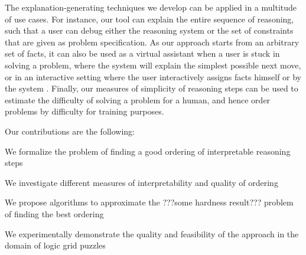 The explanation-generating techniques we develop can be applied in a multitude of use cases. 
For instance, our tool can explain the entire sequence of reasoning, such that a user can debug either the reasoning system or the set of constraints that are given as problem specification. 
As our approach starts from an arbitrary set of facts, it can also be used as a virtual assistant when a user is stuck in solving a problem, where the system will explain the simplest possible next move, or in an interactive setting where the user interactively assigns facts himself or by the system . 
Finally, our measures of simplicity of reasoning steps can be used to estimate the difficulty of solving a problem for a human, and hence order problems by difficulty for training purposes.



Our contributions are the following:
\begin{compactitem}
	\item We formalize the problem of finding a good ordering of interpretable reasoning steps
	\item We investigate different measures of interpretability and quality of ordering
	\item We propose algorithms to approximate the ???some hardness result??? problem of finding the best ordering  
	\item We experimentally demonstrate the quality and feasibility of the approach in the domain of logic grid puzzles
\end{compactitem}


